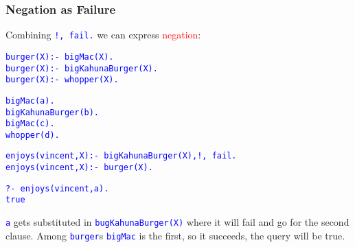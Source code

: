 \documentclass[xcolor=x11names]{beamer}
\newcommand{\cemph}[1]{\textcolor{red}{#1}}
\newcommand\ol[1]{\textcolor{blue}{\texttt{#1}}}
\begin{document}
\begin{frame}[t]
\frametitle{Negation as Failure}
\vspace{.2cm}

Combining \ol{!, fail.} we can express \cemph{negation}:\\
\vspace{.3cm}
\pause

\ol{burger(X):- bigMac(X).}\\
\ol{burger(X):- bigKahunaBurger(X).}\\
\ol{burger(X):- whopper(X).}
\vspace{.25cm}
\pause

\ol{bigMac(a).}\\
\ol{bigKahunaBurger(b).}\\
\ol{bigMac(c).}\\
\ol{whopper(d).}
\vspace{.25cm}
\pause

\ol{enjoys(vincent,X):- bigKahunaBurger(X),!, fail.}\\
\ol{enjoys(vincent,X):- burger(X).}
\vspace{.4cm}
\pause

\ol{?- enjoys(vincent,a).}\\
\pause
\ol{true}
\vspace{.25cm}
\pause

\ol{a} gets substituted in \ol{bugKahunaBurger(X)} where it will fail and go for the second clause. Among \ol{burger}s \ol{bigMac} is the first, so it succeeds, the query will be true.

\end{frame}
\end{document}
